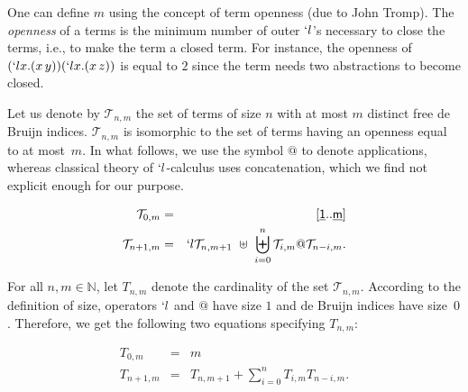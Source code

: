 \documentclass{jfp1}
\newcommand{\T}{\mathcal{T}}
\newcommand{\Var}[1]{\underline{\mathsf{#1}}}
\begin{document}
One can define $m$ using the concept of term openness (due to John Tromp).  The \emph{openness} of a
terms is the minimum number of outer $`l$'s necessary to close the terms, i.e., to
make the term a closed term.  For instance, the openness of $(`l x. (x\,y))(`l x. (x\,z))$ is equal to $2$ since the term needs two abstractions to become closed.

Let us denote by $\T_{n,m}$ the set of terms of size $n$ with at most $m$ distinct
free de Bruijn indices.  $\T_{n,m}$ is isomorphic to the set of terms having an
openness equal to at most~$m$.  In what follows, we use the symbol $@$ to denote
applications, whereas classical theory of $`l$-calculus uses concatenation, which we
find not explicit enough for our purpose.

\begin{eqnarray*}
\T_{0,m} &=& [\Var{1} .. \Var{m}] \\
\T_{n+1,m} &=& `l \T_{n,m+1} \ \uplus\ \biguplus_{i=0}^n\T_{i,m} @ \T_{n-i,m}.
\end{eqnarray*}

For all $n,m \in {\mathbb N}$, let $T_{n,m}$ denote the cardinality of the set
$\T_{n,m}$. According to the
definition of size, operators $`l$ and $@$ have size $1$ and de Bruijn indices have
size~$0$. Therefore, we get the following two equations specifying $T_{n,m}$:

\begin{eqnarray*}
 T_{0,m} &=& m\\
 T_{n+1,m} & = &T_{n,m+1} + \sum_{i=0}^{n} T_{i,m} T_{n-i,m}.
\end{eqnarray*}
\end{document}
